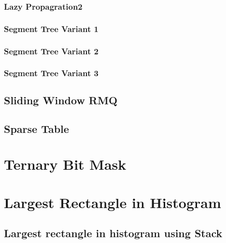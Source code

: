 \documentclass[11pt]{report}
\begin{document}
\subsubsection{Lazy Propagration2}

\subsubsection{Segment Tree Variant 1}

\subsubsection{Segment Tree Variant 2}

\subsubsection{Segment Tree Variant 3}

\subsection{Sliding Window RMQ}

\subsection{Sparse Table}



\section{Ternary Bit Mask}


\section{Largest Rectangle in Histogram }
\subsection{Largest rectangle in histogram using Stack}

\end{document}
